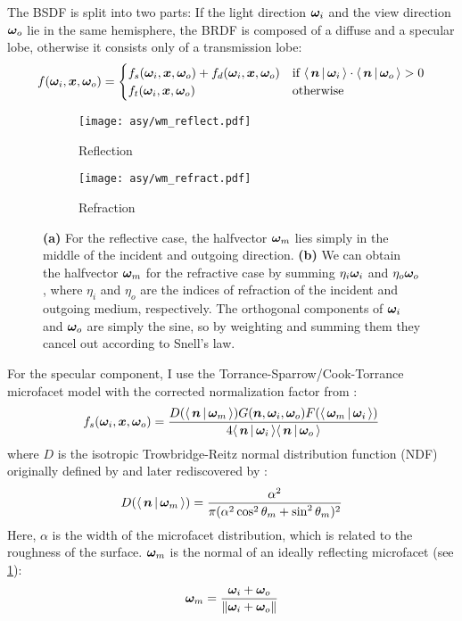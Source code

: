The BSDF is split into two parts: If the light direction ${\bm{\omega}_i}$ and the view direction ${\bm{\omega}_o}$ lie in the same hemisphere, the BRDF is composed of a diffuse and a specular lobe, otherwise it consists only of a transmission lobe:
\begin{equation}
    f(\wi, \vec{x}, \wo) =
    \begin{cases}
        f_s(\wi, \vec{x}, \wo) + f_d(\wi, \vec{x}, \wo) & \text{if } \NdotL \cdot \NdotV > 0 \\
        f_t(\wi, \vec{x}, \wo) & \text{otherwise}
    \end{cases}
\end{equation}

\begin{figure}
\begin{subfigure}{.5\textwidth}
    \centering
    \texttt{[image: asy/wm\_reflect.pdf]}
    \caption{Reflection}
    \label{fig:wm_reflect}
\end{subfigure}%
\begin{subfigure}{.5\textwidth}
    \centering
    \texttt{[image: asy/wm\_refract.pdf]}
    \caption{Refraction}
    \label{fig:wm_refract}
\end{subfigure}
\caption{
\textbf{(a)} For the reflective case, the halfvector $\bm{\omega}_m$ lies simply in the middle of the incident and outgoing direction.
\textbf{(b)} We can obtain the halfvector $\bm{\omega}_m$ for the refractive case by summing $\eta_i {\bm{\omega}_i}$ and $\eta_o {\bm{\omega}_o}$, where $\eta_i$ and $\eta_o$ are the indices of refraction of the incident and outgoing medium, respectively. The orthogonal components of ${\bm{\omega}_i}$ and ${\bm{\omega}_o}$ are simply the sine, so by weighting and summing them they cancel out according to Snell's law.
}
\end{figure}

For the specular component, I use the Torrance-Sparrow/Cook-Torrance microfacet model \parencite{torrance1967, cook1982} with the corrected normalization factor from \textcite{walter2007}:
\begin{equation}
    f_s(\wi, \vec{x}, \wo) = \frac{D(\NdotH) G(\n, \wi, \wo) F(\LdotH)}{4 \NdotL \NdotV}
\end{equation}
where $D$ is the isotropic Trowbridge-Reitz normal distribution function (NDF) originally defined by \textcite{trowbridge1975} and later rediscovered by \textcite{walter2007}:
\begin{equation}
    D(\NdotH) = \frac{\alpha^2}{\pi (\alpha^2 \cos^2 \theta_m + \sin^2 \theta_m)^2}
\end{equation}
Here, $\alpha$ is the width of the microfacet distribution, which is related to the roughness of the surface.
$\bm{\omega}_m$ is the normal of an ideally reflecting microfacet (see \cref{fig:wm_reflect}):
\begin{equation}
    \bm{\omega}_m = \frac{{\bm{\omega}_i} + {\bm{\omega}_o}}{\|{\bm{\omega}_i} + {\bm{\omega}_o}\|}
\end{equation}

